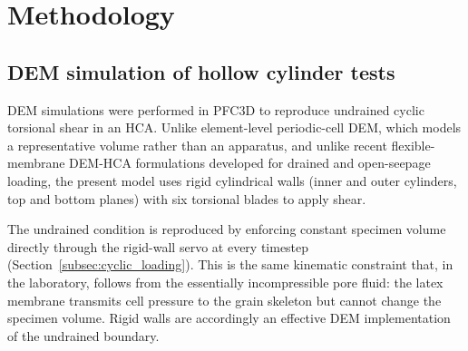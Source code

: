 \section{Methodology}
\label{sec:methodology}

\subsection{DEM simulation of hollow cylinder tests}
\label{subsec:dem_hca}

DEM simulations were performed in \textsc{PFC3D} \citep{Itasca2021} to reproduce undrained cyclic torsional shear in an HCA. Unlike element-level periodic-cell DEM, which models a representative volume rather than an apparatus, and unlike recent flexible-membrane DEM-HCA formulations \citep{Song2024,Song2024suffusion} developed for drained and open-seepage loading, the present model uses rigid cylindrical walls (inner and outer cylinders, top and bottom planes) with six torsional blades to apply shear.

The undrained condition is reproduced by enforcing constant specimen volume directly through the rigid-wall servo at every timestep (Section~\ref{subsec:cyclic_loading}). This is the same kinematic constraint that, in the laboratory, follows from the essentially incompressible pore fluid: the latex membrane transmits cell pressure to the grain skeleton but cannot change the specimen volume. Rigid walls are accordingly an effective DEM implementation of the undrained boundary.

